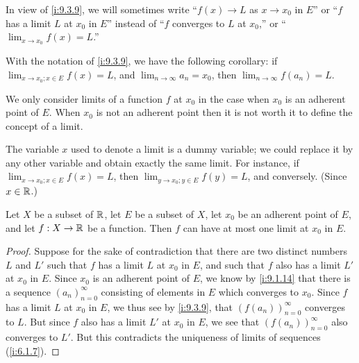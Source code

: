 \begin{note}
  In view of \cref{i:9.3.9}, we will sometimes write ``\(f(x) \to L\) as \(x \to x_0\) in \(E\)'' or ``\(f\) has a limit \(L\) at \(x_0\) in \(E\)'' instead of ``\(f\) converges to \(L\) at \(x_0\),'' or ``\(\lim_{x \to x_0} f(x) = L\).''
\end{note}

\begin{rmk}\label{i:9.3.10}
  With the notation of \cref{i:9.3.9}, we have the following corollary:
  if \(\lim_{x \to x_0 ; x \in E} f(x) = L\), and \(\lim_{n \to \infty} a_n = x_0\), then \(\lim_{n \to \infty} f(a_n) = L\).
\end{rmk}

\begin{rmk}\label{i:9.3.11}
  We only consider limits of a function \(f\) at \(x_0\) in the case when \(x_0\) is an adherent point of \(E\).
  When \(x_0\) is not an adherent point then it is not worth it to define the concept of a limit.
\end{rmk}

\begin{rmk}\label{i:9.3.12}
  The variable \(x\) used to denote a limit is a dummy variable;
  we could replace it by any other variable and obtain exactly the same limit.
  For instance, if \(\lim_{x \to x_0 ; x \in E} f(x) = L\), then \(\lim_{y \to x_0 ; y \in E} f(y) = L\), and conversely.
  (Since \(x \in \mathbb{R}\).)
\end{rmk}

\begin{cor}\label{i:9.3.13}
  Let \(X\) be a subset of \(\mathbb{R}\), let \(E\) be a subset of \(X\), let \(x_0\) be an adherent point of \(E\), and let \(f : X \to \mathbb{R}\) be a function.
  Then \(f\) can have at most one limit at \(x_0\) in \(E\).
\end{cor}

\begin{proof}
  Suppose for the sake of contradiction that there are two distinct numbers \(L\) and \(L'\) such that \(f\) has a limit \(L\) at \(x_0\) in \(E\), and such that \(f\) also has a limit \(L'\) at \(x_0\) in \(E\).
  Since \(x_0\) is an adherent point of \(E\), we know by \cref{i:9.1.14} that there is a sequence \((a_n)_{n = 0}^\infty\) consisting of elements in \(E\) which converges to \(x_0\).
  Since \(f\) has a limit \(L\) at \(x_0\) in \(E\), we thus see by \cref{i:9.3.9}, that \((f(a_n))_{n = 0}^\infty\) converges to \(L\).
  But since \(f\) also has a limit \(L'\) at \(x_0\) in \(E\), we see that \((f(a_n))_{n = 0}^\infty\) also converges to \(L'\).
  But this contradicts the uniqueness of limits of sequences (\cref{i:6.1.7}).
\end{proof}

